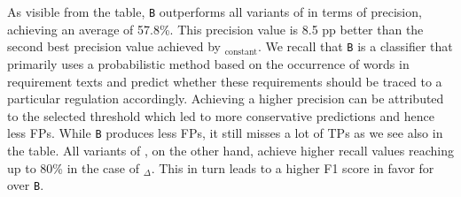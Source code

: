 As visible from the table, \texttt{B} outperforms all variants of \kashif in terms of precision, achieving an average of 57.8\%. This precision value is 8.5 pp better than the second best precision value achieved by  \kashif$_{\text{constant}}$.
We recall that \texttt{B} is a classifier that primarily uses a probabilistic method based on the occurrence of words in requirement texts and predict whether these requirements should be traced to a particular regulation accordingly.   
Achieving a higher precision can be attributed to the selected threshold which led to more conservative predictions and hence less FPs.  %
While \texttt{B} produces less FPs, it still misses a lot of TPs as we see also in the table. All variants of \kashif, on the other hand, achieve higher recall values reaching up to 80\% in the case of \kashif$_{\Delta}$. This in turn leads to a higher F1 score in favor for \kashif over  \texttt{B}.  %


